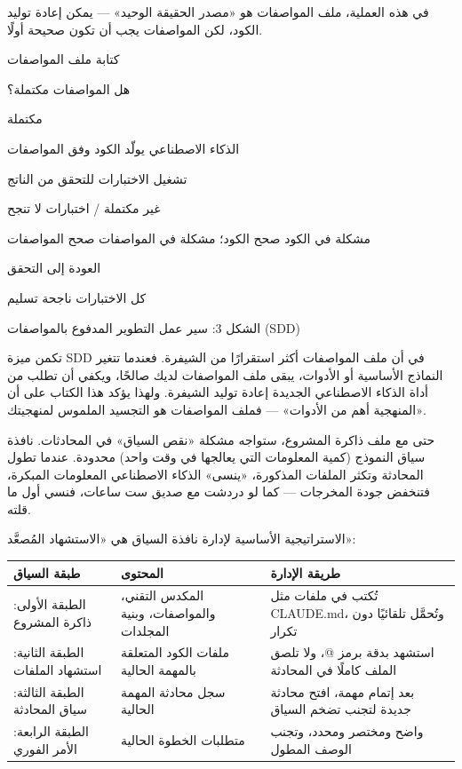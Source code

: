 في هذه العملية، ملف المواصفات هو «مصدر الحقيقة الوحيد» — يمكن إعادة توليد الكود، لكن المواصفات يجب أن تكون صحيحة أولًا.

كتابة ملف المواصفات

هل المواصفات مكتملة؟

مكتملة

الذكاء الاصطناعي يولّد الكود وفق المواصفات

تشغيل الاختبارات للتحقق من الناتج

غير مكتملة / اختبارات لا تنجح

مشكلة في الكود صحح الكود؛ مشكلة في المواصفات صحح المواصفات

العودة إلى التحقق

كل الاختبارات ناجحة تسليم

\begin{center}\small\color{gray}الشكل 3: سير عمل التطوير المدفوع بالمواصفات (SDD)\end{center}

تكمن ميزة SDD في أن ملف المواصفات أكثر استقرارًا من الشيفرة. فعندما تتغير النماذج الأساسية أو الأدوات، يبقى ملف المواصفات لديك صالحًا، ويكفي أن تطلب من أداة الذكاء الاصطناعي الجديدة إعادة توليد الشيفرة. ولهذا يؤكد هذا الكتاب على أن «المنهجية أهم من الأدوات» — فملف المواصفات هو التجسيد الملموس لمنهجيتك.


حتى مع ملف ذاكرة المشروع، ستواجه مشكلة «نقص السياق» في المحادثات. نافذة سياق النموذج (كمية المعلومات التي يعالجها في وقت واحد) محدودة. عندما تطول المحادثة وتكثر الملفات المذكورة، «ينسى» الذكاء الاصطناعي المعلومات المبكرة، فتنخفض جودة المخرجات — كما لو دردشت مع صديق ست ساعات، فنسي أول ما قلته.

الاستراتيجية الأساسية لإدارة نافذة السياق هي «الاستشهاد المُصعَّد»:

\begin{center}
\begin{tabularx}{\linewidth}{|X|X|X|}
\hline
\textbf{طبقة السياق} & \textbf{المحتوى} & \textbf{طريقة الإدارة} \tabularnewline
\hline
الطبقة الأولى: ذاكرة المشروع & المكدس التقني، والمواصفات، وبنية المجلدات & تُكتب في ملفات مثل CLAUDE.md، وتُحمَّل تلقائيًا دون تكرار \tabularnewline
الطبقة الثانية: استشهاد الملفات & ملفات الكود المتعلقة بالمهمة الحالية & استشهد بدقة برمز @، ولا تلصق الملف كاملًا في المحادثة \tabularnewline
الطبقة الثالثة: سياق المحادثة & سجل محادثة المهمة الحالية & بعد إتمام مهمة، افتح محادثة جديدة لتجنب تضخم السياق \tabularnewline
الطبقة الرابعة: الأمر الفوري & متطلبات الخطوة الحالية & واضح ومختصر ومحدد، وتجنب الوصف المطول \tabularnewline
\hline
\end{tabularx}
\end{center}

